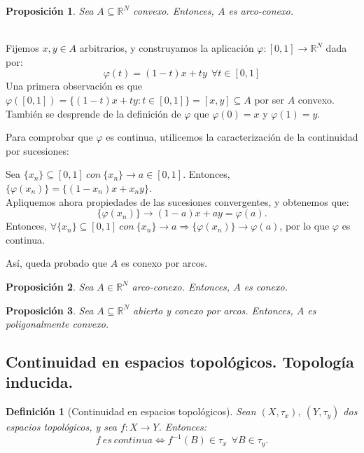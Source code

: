 \documentclass[11pt, a4paper, titlepage]{article}
\makeatletter
\renewenvironment{proof}[1][\proofname] {\vspace{-15pt}\par\pushQED{\qed}\normalfont\topsep6\p@\@plus6\p@\relax\trivlist\item[\hskip\labelsep\it#1\@addpunct{.}]\ignorespaces}{\popQED\endtrivlist\@endpefalse}
\theoremstyle{theorem-style}
\newtheorem*{nprop}{Proposición}
\theoremstyle{definition-style}
\newtheorem*{ndef}{Definición}
\theoremstyle{remark-style}
\theoremstyle{example-style}
\makeatother
\begin{document}
\begin{nprop}
Sea $A \subseteq \mathbb{R}^N$ convexo. Entonces, $A$ es arco-conexo.
\end{nprop}

\begin{proof} \hfill \\
Fijemos $x,y \in A$ arbitrarios, y construyamos la aplicación $\varphi: [0,1] \longrightarrow \mathbb{R}^N$ dada por: $$\varphi(t) = (1-t)x + ty\ \ \forall t\in [0,1]$$
Una primera observación es que $\varphi([0,1]) = \{(1-t)x + ty: t \in [0,1]\} = [x,y] \subseteq A$ por ser $A$ convexo. También se desprende de la definición de $\varphi$ que $\varphi(0) = x$ y $\varphi(1) = y$.

Para comprobar que $\varphi$ es continua, utilicemos la caracterización de la continuidad por sucesiones:

Sea $\{x_n\} \subseteq [0,1]\ con\ \{x_n\} \rightarrow a \in [0,1]$. Entonces, $\{\varphi(x_n) \} = \{(1- x_n)x + x_n y\}$. \\Apliquemos ahora propiedades de las sucesiones convergentes, y obtenemos que: $$\{\varphi(x_n) \} \rightarrow (1-a)x + ay = \varphi(a).$$
Entonces, $\forall \{x_n\} \subseteq [0,1]\ con\ \{x_n\} \rightarrow a \Rightarrow \{\varphi(x_n) \} \rightarrow \varphi(a)$, por lo que $\varphi$ es continua.

Así, queda probado que $A$ es conexo por arcos.
\end{proof}



\begin{nprop}
Sea $A\in \mathbb{R}^N$ arco-conexo. Entonces, $A$ es conexo.
\end{nprop}



\begin{nprop}
Sea $A\subseteq \mathbb{R}^N$ abierto y conexo por arcos. Entonces, $A$ es poligonalmente convexo.
\end{nprop}


\subsection{Continuidad en espacios topológicos. Topología inducida.}

\begin{ndef}[Continuidad en espacios topológicos]
Sean $(X,\tau_x),\ (Y,\tau_y)$ dos espacios topológicos, y sea $f:X\longrightarrow Y$. Entonces: $$f\ es\ continua \iff f^{-1}(B) \in \tau_x \ \ \forall B \in \tau_y.$$
\end{ndef}
\end{document}
